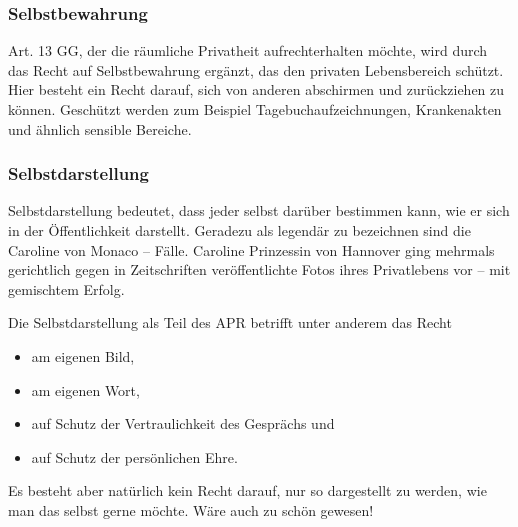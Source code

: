 \subsubsection{Selbstbewahrung}
\label{sec:Selbstbewahrung}

Art. 13 GG, der die räumliche Privatheit aufrechterhalten möchte, wird durch das Recht auf Selbstbewahrung ergänzt, das den privaten Lebensbereich schützt. Hier besteht ein Recht darauf, sich von anderen abschirmen und zurückziehen zu können. Geschützt werden zum Beispiel Tagebuchaufzeichnungen, Krankenakten und ähnlich sensible Bereiche.

\subsubsection{Selbstdarstellung}
\label{sec:Selbstdarstellung}

Selbstdarstellung bedeutet, dass jeder selbst darüber bestimmen kann, wie er sich in der Öffentlichkeit darstellt. Geradezu als legendär zu bezeichnen sind die Caroline von Monaco – Fälle. Caroline Prinzessin von Hannover ging mehrmals gerichtlich gegen in Zeitschriften veröffentlichte Fotos ihres Privatlebens vor – mit gemischtem Erfolg.

Die Selbstdarstellung als Teil des APR betrifft unter anderem das Recht

\begin{itemize}
	\item am eigenen Bild,
	\item am eigenen Wort,
	\item auf Schutz der Vertraulichkeit des Gesprächs und
	\item auf Schutz der persönlichen Ehre.
\end{itemize}

Es besteht aber natürlich kein Recht darauf, nur so dargestellt zu werden, wie man das selbst gerne möchte. Wäre auch zu schön gewesen!